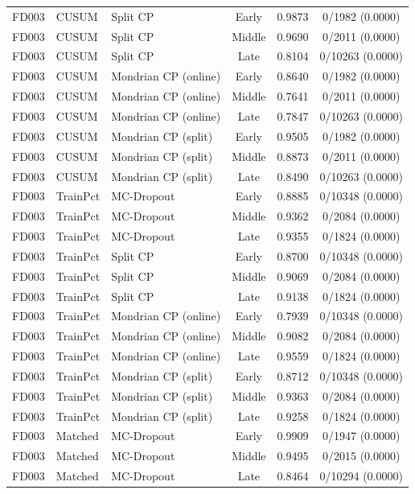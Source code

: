\begin{table}[t]
\begin{tabular}{lllccc}
FD003 & CUSUM & Split CP & Early & 0.9873 & 0/1982 (0.0000) \\
FD003 & CUSUM & Split CP & Middle & 0.9690 & 0/2011 (0.0000) \\
FD003 & CUSUM & Split CP & Late & 0.8104 & 0/10263 (0.0000) \\
FD003 & CUSUM & Mondrian CP (online) & Early & 0.8640 & 0/1982 (0.0000) \\
FD003 & CUSUM & Mondrian CP (online) & Middle & 0.7641 & 0/2011 (0.0000) \\
FD003 & CUSUM & Mondrian CP (online) & Late & 0.7847 & 0/10263 (0.0000) \\
FD003 & CUSUM & Mondrian CP (split) & Early & 0.9505 & 0/1982 (0.0000) \\
FD003 & CUSUM & Mondrian CP (split) & Middle & 0.8873 & 0/2011 (0.0000) \\
FD003 & CUSUM & Mondrian CP (split) & Late & 0.8490 & 0/10263 (0.0000) \\
FD003 & TrainPct & MC-Dropout & Early & 0.8885 & 0/10348 (0.0000) \\
FD003 & TrainPct & MC-Dropout & Middle & 0.9362 & 0/2084 (0.0000) \\
FD003 & TrainPct & MC-Dropout & Late & 0.9355 & 0/1824 (0.0000) \\
FD003 & TrainPct & Split CP & Early & 0.8700 & 0/10348 (0.0000) \\
FD003 & TrainPct & Split CP & Middle & 0.9069 & 0/2084 (0.0000) \\
FD003 & TrainPct & Split CP & Late & 0.9138 & 0/1824 (0.0000) \\
FD003 & TrainPct & Mondrian CP (online) & Early & 0.7939 & 0/10348 (0.0000) \\
FD003 & TrainPct & Mondrian CP (online) & Middle & 0.9082 & 0/2084 (0.0000) \\
FD003 & TrainPct & Mondrian CP (online) & Late & 0.9559 & 0/1824 (0.0000) \\
FD003 & TrainPct & Mondrian CP (split) & Early & 0.8712 & 0/10348 (0.0000) \\
FD003 & TrainPct & Mondrian CP (split) & Middle & 0.9363 & 0/2084 (0.0000) \\
FD003 & TrainPct & Mondrian CP (split) & Late & 0.9258 & 0/1824 (0.0000) \\
FD003 & Matched & MC-Dropout & Early & 0.9909 & 0/1947 (0.0000) \\
FD003 & Matched & MC-Dropout & Middle & 0.9495 & 0/2015 (0.0000) \\
FD003 & Matched & MC-Dropout & Late & 0.8464 & 0/10294 (0.0000) \\

\end{tabular}
\end{table}
